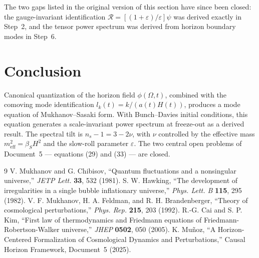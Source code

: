 \documentclass[12pt,a4paper]{article}
\begin{document}
The two gaps listed in the original version of this section have since been closed: the gauge-invariant identification $\mathcal{R} = [(1+\varepsilon)/\varepsilon]\psi$ was derived exactly in Step~2, and the tensor power spectrum was derived from horizon boundary modes in Step~6.

\section{Conclusion}

Canonical quantization of the horizon field $\phi(\Omega, t)$, combined with the comoving mode identification $l_k(t) = k/(a(t)H(t))$, produces a mode equation of Mukhanov--Sasaki form. With Bunch--Davies initial conditions, this equation generates a scale-invariant power spectrum at freeze-out as a derived result. The spectral tilt is $n_s - 1 = 3 - 2\nu$, with $\nu$ controlled by the effective mass $m_\text{eff}^2 = \beta_S H^2$ and the slow-roll parameter $\varepsilon$. The two central open problems of Document~5 --- equations (29) and (33) --- are closed.

\begin{thebibliography}{9}
 V. Mukhanov and G. Chibisov, ``Quantum fluctuations and a nonsingular universe,'' \textit{JETP Lett.} \textbf{33}, 532 (1981).
 S. W. Hawking, ``The development of irregularities in a single bubble inflationary universe,'' \textit{Phys. Lett. B} \textbf{115}, 295 (1982).
 V. F. Mukhanov, H. A. Feldman, and R. H. Brandenberger, ``Theory of cosmological perturbations,'' \textit{Phys. Rep.} \textbf{215}, 203 (1992).
 R.-G. Cai and S. P. Kim, ``First law of thermodynamics and Friedmann equations of Friedmann-Robertson-Walker universe,'' \textit{JHEP} \textbf{0502}, 050 (2005).
 K. Mu\~noz, ``A Horizon-Centered Formalization of Cosmological Dynamics and Perturbations,'' Causal Horizon Framework, Document~5 (2025).
\end{thebibliography}
\end{document}
